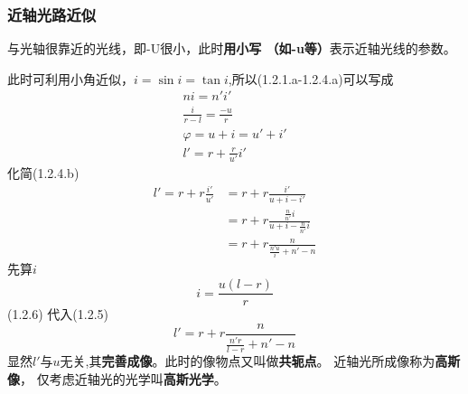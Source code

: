 \subsubsection{近轴光路近似}

\begin{description}[leftmargin=1cm,style=nextline,nosep]%
    \item[近轴（傍轴）光线] 与光轴很靠近的光线，即-U很小，此时\textbf{用小写
            （如-u等）}表示近轴光线的参数。
\end{description}
此时可利用小角近似，$i=\sin i= \tan i$,所以(1.2.1.a-1.2.4.a)可以写成
\begin{align}
    n i =n' i '\tag{1.2.1.b}                 \\
    \frac{i }{r-l}=\frac{-u}{r}\tag{1.2.2.b} \\
    \varphi=u+i=u'+i' \tag{1.2.3.b}          \\
    l'=r+\frac{r}{ u'}  i' \tag{1.2.4.b}
\end{align}
化简(1.2.4.b)
\begin{equation}
    \begin{aligned}
        l'=r+r \frac{i'}{u'} & =r+r \frac{i'}{u+i-i'}                       \\
                             & =r+r \frac{\frac{n}{n'}i}{u+i-\frac{n}{n'}i} \\
                             & =r+r \frac{n}{\frac{n'u}{i}+n'-n}
    \end{aligned}
    \tag{1.2.5}
\end{equation}
先算$i$
\begin{equation}
    i= \frac{u(l-r)}{r}\tag{1.2.6}
\end{equation}
(1.2.6) 代入(1.2.5)
\begin{equation}
    l'=r+r \frac{n}{\frac{n'r}{l-r}+n'-n}\tag{1.2.7}
\end{equation}
显然$l'$与$u$无关,其\textbf{完善成像}。此时的像物点又叫做\textbf{共轭点}。
近轴光所成像称为\textbf{高斯像}，
仅考虑近轴光的光学叫\textbf{高斯光学}。
